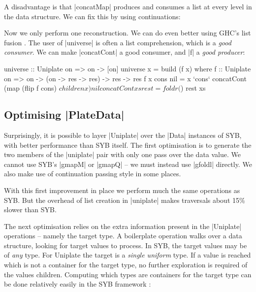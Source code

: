 A disadvantage is that |concatMap| produces and consumes a list at every level in the data structure. We can fix this by using continuations:


Now we only perform one reconstruction. We can do even better using GHC's list fusion \cite{spj:rules}. The user of |universe| is often a list comprehension, which is a \textit{good consumer}. We can make |concatCont| a good consumer, and |f| a \textit{good producer}:

\begin{code}
universe :: Uniplate on => on -> [on]
universe x = build (f x)
    where
    f :: Uniplate on => on -> (on -> res -> res) -> res -> res
    f x cons nil = x `cons`
        concatCont (map (flip f cons) $ children x) nil

concatCont xs rest = foldr ($) rest xs
\end{code}

\subsection{Optimising |PlateData|}
\label{sec:optimise_playdata}

Surprisingly, it is possible to layer |Uniplate| over the |Data| instances of SYB, with better performance than SYB itself. The first optimisation is to generate the two members of the |uniplate| pair with only one pass over the data value. We cannot use SYB's |gmapM| or |gmapQ| -- we must instead use |gfoldl| directly. We also make use of continuation passing style in some places.

With this first improvement in place we perform much the same operations as SYB. But the overhead of list creation in |uniplate| makes traversals about 15\% slower than SYB.

The next optimisation relies on the extra information present in the |Uniplate| operations -- namely the target type. A boilerplate operation walks over a data structure, looking for target values to process. In SYB, the target values may be of \textit{any} type. For Uniplate the target is a \textit{single uniform} type. If a value is reached which is not a container for the target type, no further exploration is required of the values children. Computing which types are containers for the target type can be done relatively easily in the SYB framework \citep{lammel:syb2}:

